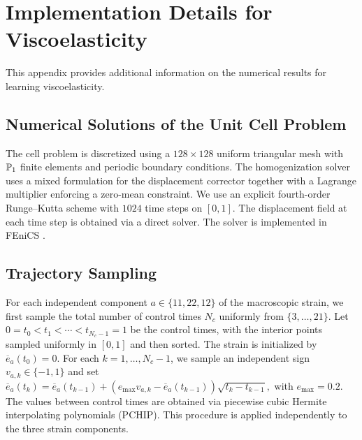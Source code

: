 \section{Implementation Details for Viscoelasticity}\label{app:kv2d_details}

This appendix provides additional information on the numerical results for learning viscoelasticity.

\subsection{Numerical Solutions of the Unit Cell Problem}\label{app:kv2d_cell_solver}
The cell problem is discretized using a $128\times128$ uniform triangular mesh with $\mathbb{P}_1$ finite elements and periodic boundary conditions. The homogenization solver uses a mixed formulation for the displacement corrector together with a Lagrange multiplier enforcing a zero-mean constraint. We use an explicit fourth-order Runge--Kutta scheme with $1024$ time steps on {$[0,1]$}. The displacement field at each time step is obtained via a direct solver. The solver is implemented in FEniCS \cite{logg2012automated, alnaes2015fenics}.

\subsection{Trajectory Sampling}\label{app:kv2d_strain_sampling}
For each independent component $a\in\{11,22,12\}$ of the macroscopic strain, we first sample the total number of control times $N_c$ uniformly from $\{3,\dots,21\}$. Let $0=t_0<t_1<\cdots<t_{N_c-1}=1$ be the control times, with the interior points sampled uniformly in $[0,1]$ and then sorted. The strain is initialized by $\overline e_a(t_0)=0$. For each $k=1,\dots,N_c-1$, we sample an independent sign $v_{a,k}\in\{-1,1\}$ and set $
    \overline e_a(t_k)
    =
    \overline e_a(t_{k-1})
    +
    \left(e_{\mathrm{max}}v_{a,k}-\overline e_a(t_{k-1})\right)
    \sqrt{t_k-t_{k-1}},$ with $e_{\mathrm{max}}=0.2$.
The values between control times are obtained via piecewise cubic Hermite interpolating polynomials (PCHIP). This procedure is applied independently to the three strain components.

